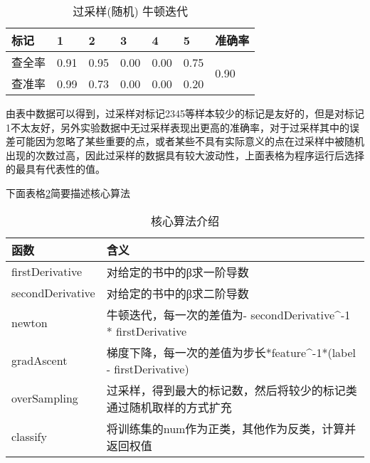 \documentclass[a4paper,UTF8]{article}
\numberwithin{equation}{section}
\begin{document}
\begin{enumerate}[(1)]
	\begin{table}[!h]
		\centering
		\caption{过采样(随机) 牛顿迭代}
		\label{}
		\begin{tabular}{l|llllll}
			\hline
			标记  & 1    & 2    & 3    & 4    & 5    & 准确率                   \\ \hline
			查全率 & 0.91 & 0.95 & 0.00 & 0.00 & 0.75 & \multirow{2}{*}{0.90} \\ \cline{1-1}
			查准率 & 0.99 & 0.73 & 0.00 & 0.00 & 0.20 &                       \\ \hline
		\end{tabular}
	\end{table}

	
	由表中数据可以得到，过采样对标记2345等样本较少的标记是友好的，但是对标记1不太友好，另外实验数据中无过采样表现出更高的准确率，对于过采样其中的误差可能因为忽略了某些重要的点，或者某些不具有实际意义的点在过采样中被随机出现的次数过高，因此过采样的数据具有较大波动性，上面表格为程序运行后选择的最具有代表性的值。
	
	下面表格\ref{my-label}简要描述核心算法
	
	\begin{table}[!h]
		\centering
		\caption{核心算法介绍}
		\label{my-label}
		\begin{tabular}{|l|l|}
			\hline
			函数               & 含义                                                                  \\ \hline
			firstDerivative  & 对给定的书中的β求一阶导数                                                       \\ \hline
			secondDerivative & 对给定的书中的β求二阶导数                                                       \\ \hline
			newton           & 牛顿迭代，每一次的差值为- secondDerivative\textasciicircum -1 * firstDerivative \\ \hline
			gradAscent       & 梯度下降，每一次的差值为步长*feature\textasciicircum -1*(label - firstDerivative) \\ \hline
			overSampling     & 过采样，得到最大的标记数，然后将较少的标记类通过随机取样的方式扩充                                   \\ \hline
			classify         & 将训练集的num作为正类，其他作为反类，计算并返回权值                                         \\ \hline
		\end{tabular}
	\end{table}


\end{enumerate}
\end{document}
